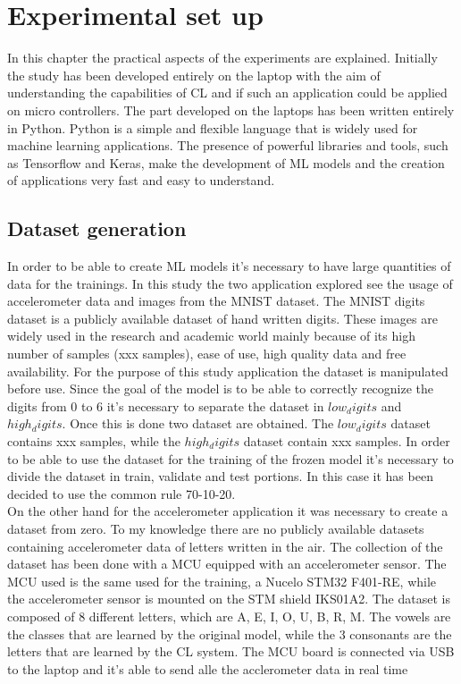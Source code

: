 \documentclass[12pt]{report}
\begin{document}
\chapter{Experimental set up}

In this chapter the practical aspects of the experiments are explained. Initially the study has been developed entirely on the laptop with the aim of understanding the capabilities of CL and if such an application could be applied on micro controllers. The part developed on the laptops has been written entirely in Python. Python is a simple and flexible language that is widely used for machine learning applications. The presence of powerful libraries and tools, such as Tensorflow and Keras, make the development of ML models and the creation of applications very fast and easy to understand. \\

\section{Dataset generation}

In order to be able to create ML models it's necessary to have large quantities of data for the trainings. In this study the two application explored see the usage of accelerometer data and images from the MNIST dataset. The MNIST digits dataset is a publicly available dataset of hand written digits. These images are widely used in the research and academic world mainly because of its high number of samples (xxx samples), ease of use, high quality data and free availability. For the purpose of this study application the dataset is manipulated before use. Since the goal of the model is to be able to correctly recognize the digits from 0 to 6 it's necessary to separate the dataset in $low_digits$ and $high_digits$. Once this is done two dataset are obtained. The $low_digits$ dataset contains xxx samples, while the $high_digits$ dataset contain xxx samples. In order to be able to use the dataset for the training of the frozen model it's necessary to divide the dataset in train, validate and test portions. In this case it has been decided to use the common rule 70-10-20. \\
On the other hand for the accelerometer application it was necessary to create a dataset from zero. To my knowledge there are no publicly available datasets containing accelerometer data of letters written in the air. The collection of the dataset has been done with a MCU equipped with an accelerometer sensor. The MCU used is the same used for the training, a Nucelo STM32 F401-RE, while the accelerometer sensor is mounted on the STM shield IKS01A2. The dataset is composed of 8 different letters, which are A, E, I, O, U, B, R, M. The vowels are the classes that are learned by the original model, while the 3 consonants are the letters that are learned by the CL system. The MCU board is connected via USB to the laptop and it's able to send alle the acclerometer data in real time
\end{document}
